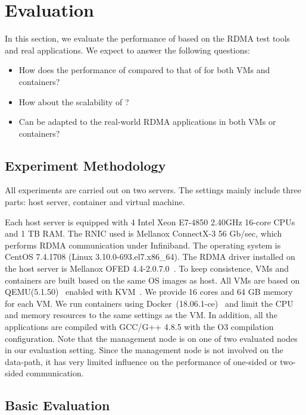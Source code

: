 \section{Evaluation} \label{eval}
In this section, we evaluate the performance of \sys based on the RDMA test tools and real applications. We expect to answer the following questions:

\begin{itemize}
\item How does the performance of \sys compared to that of \native for both VMs and containers?
\item How about the scalability of \sys?
\item Can \sys be adapted to the real-world RDMA applications in both VMs or containers?

\end{itemize}

\subsection{Experiment Methodology}


All experiments are carried out on two servers. The settings mainly include three parts: host server, container and virtual machine. 

Each host server is equipped with 4 Intel Xeon E7-4850 2.40GHz 16-core CPUs and 1 TB RAM. The RNIC used is Mellanox ConnectX-3 56 Gb/sec, which performs RDMA communication under Infiniband.  The operating system is CentOS 7.4.1708 (Linux 3.10.0-693.el7.x86\_64). The RDMA driver installed on the host server is Mellanox OFED 4.4-2.0.7.0~\cite{mlnx-ofed}. To keep consistence, VMs and containers are built based on the same OS images as host. All VMs are based on QEMU(5.1.50)~\cite{qemu} enabled with KVM~\cite{kvm}. We provide 16 cores and 64 GB memory for each VM. We run containers using Docker~(18.06.1-ce)~\cite{docker} and limit the CPU and memory resources to the same settings as the VM. In addition, all the applications are compiled with GCC/G++ 4.8.5 with the O3 compilation configuration. Note that the management node is on one of two evaluated nodes in our evaluation setting. Since the management node is not involved on the data-path, it has very limited influence on the performance of one-sided or two-sided communication.


\subsection{Basic Evaluation}

